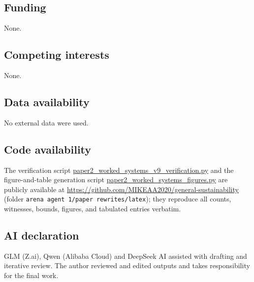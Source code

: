 \documentclass[10pt,twocolumn]{article}
\theoremstyle{definition}
\begin{document}
\subsection*{Funding}
None.

\subsection*{Competing interests}
None.

\subsection*{Data availability}
No external data were used.

\subsection*{Code availability}
The verification script \url{paper2_worked_systems_v9_verification.py}
and the figure-and-table generation script
\url{paper2_worked_systems_figures.py} are publicly available at
\url{https://github.com/MIKEAA2020/general-sustainability} (folder
\texttt{arena agent 1/paper rewrites/latex}); they reproduce all
counts, witnesses, bounds, figures, and tabulated entries verbatim.

\subsection*{AI declaration}
GLM (Z.ai), Qwen (Alibaba Cloud) and DeepSeek AI assisted with drafting
and iterative review. The author reviewed and edited outputs and takes
responsibility for the final work.
\end{document}
